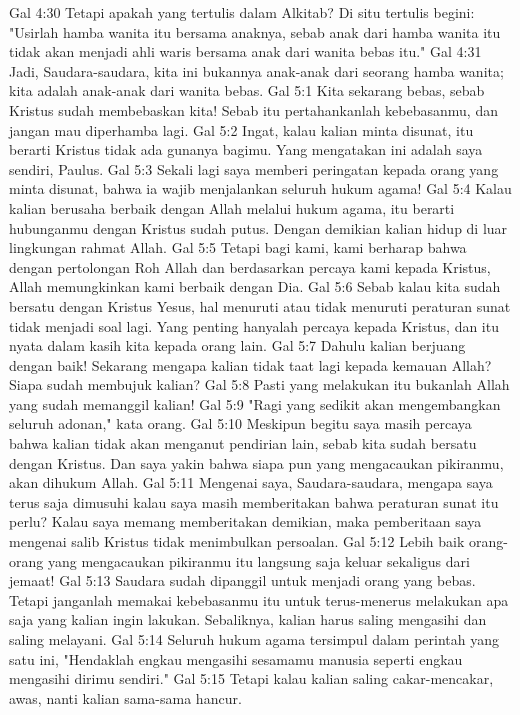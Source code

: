 Gal 4:30  Tetapi apakah yang tertulis dalam Alkitab? Di situ tertulis begini: "Usirlah hamba wanita itu bersama anaknya, sebab anak dari hamba wanita itu tidak akan menjadi ahli waris bersama anak dari wanita bebas itu."
Gal 4:31  Jadi, Saudara-saudara, kita ini bukannya anak-anak dari seorang hamba wanita; kita adalah anak-anak dari wanita bebas.
Gal 5:1  Kita sekarang bebas, sebab Kristus sudah membebaskan kita! Sebab itu pertahankanlah kebebasanmu, dan jangan mau diperhamba lagi.
Gal 5:2  Ingat, kalau kalian minta disunat, itu berarti Kristus tidak ada gunanya bagimu. Yang mengatakan ini adalah saya sendiri, Paulus.
Gal 5:3  Sekali lagi saya memberi peringatan kepada orang yang minta disunat, bahwa ia wajib menjalankan seluruh hukum agama!
Gal 5:4  Kalau kalian berusaha berbaik dengan Allah melalui hukum agama, itu berarti hubunganmu dengan Kristus sudah putus. Dengan demikian kalian hidup di luar lingkungan rahmat Allah.
Gal 5:5  Tetapi bagi kami, kami berharap bahwa dengan pertolongan Roh Allah dan berdasarkan percaya kami kepada Kristus, Allah memungkinkan kami berbaik dengan Dia.
Gal 5:6  Sebab kalau kita sudah bersatu dengan Kristus Yesus, hal menuruti atau tidak menuruti peraturan sunat tidak menjadi soal lagi. Yang penting hanyalah percaya kepada Kristus, dan itu nyata dalam kasih kita kepada orang lain.
Gal 5:7  Dahulu kalian berjuang dengan baik! Sekarang mengapa kalian tidak taat lagi kepada kemauan Allah? Siapa sudah membujuk kalian?
Gal 5:8  Pasti yang melakukan itu bukanlah Allah yang sudah memanggil kalian!
Gal 5:9  "Ragi yang sedikit akan mengembangkan seluruh adonan," kata orang.
Gal 5:10  Meskipun begitu saya masih percaya bahwa kalian tidak akan menganut pendirian lain, sebab kita sudah bersatu dengan Kristus. Dan saya yakin bahwa siapa pun yang mengacaukan pikiranmu, akan dihukum Allah.
Gal 5:11  Mengenai saya, Saudara-saudara, mengapa saya terus saja dimusuhi kalau saya masih memberitakan bahwa peraturan sunat itu perlu? Kalau saya memang memberitakan demikian, maka pemberitaan saya mengenai salib Kristus tidak menimbulkan persoalan.
Gal 5:12  Lebih baik orang-orang yang mengacaukan pikiranmu itu langsung saja keluar sekaligus dari jemaat!
Gal 5:13  Saudara sudah dipanggil untuk menjadi orang yang bebas. Tetapi janganlah memakai kebebasanmu itu untuk terus-menerus melakukan apa saja yang kalian ingin lakukan. Sebaliknya, kalian harus saling mengasihi dan saling melayani.
Gal 5:14  Seluruh hukum agama tersimpul dalam perintah yang satu ini, "Hendaklah engkau mengasihi sesamamu manusia seperti engkau mengasihi dirimu sendiri."
Gal 5:15  Tetapi kalau kalian saling cakar-mencakar, awas, nanti kalian sama-sama hancur.
